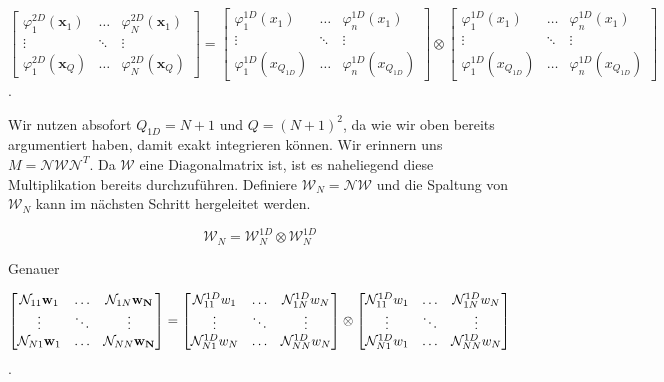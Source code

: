 \begin{equation*}
\begin{bmatrix}
\varphi^{2D}_1(\bm{x}_1) & \hdots & \varphi^{2D}_N(\bm{x}_1) \\
\vdots & \ddots & \vdots \\
\varphi^{2D}_1(\bm{x}_Q) & \hdots & \varphi^{2D}_N(\bm{x}_Q)
\end{bmatrix}
=
\begin{bmatrix}
\varphi^{1D}_1(x_1) & \hdots & \varphi^{1D}_n(x_1) \\
\vdots & \ddots & \vdots \\
\varphi^{1D}_1(x_{Q_{1D}}) & \hdots & \varphi^{1D}_n(x_{Q_{1D}})
\end{bmatrix}
\otimes
\begin{bmatrix}
\varphi^{1D}_1(x_1) & \hdots & \varphi^{1D}_n(x_1) \\
\vdots & \ddots & \vdots \\
\varphi^{1D}_1(x_{Q_{1D}}) & \hdots & \varphi^{1D}_n(x_{Q_{1D}})
\end{bmatrix}
\end{equation*}.

Wir nutzen absofort $Q_{1D}=N+1$ und $Q=(N+1)^2$, da wie wir oben bereits argumentiert haben, damit exakt integrieren können.
Wir erinnern uns $M=\mathcal{N} \mathcal{W} \mathcal{N}^T$. Da $\mathcal{W}$ eine Diagonalmatrix ist, ist es naheliegend diese Multiplikation bereits durchzuführen. Definiere $\mathcal{W}_{N}=\mathcal{N} \mathcal{W}$ und die Spaltung von $\mathcal{W}_N$ kann im nächsten Schritt hergeleitet werden.

\begin{equation} \label{eq:weight}
\mathcal{W}_N = \mathcal{W}_N^{1D} \otimes \mathcal{W}_N^{1D}
\end{equation}

Genauer

\begin{equation*}
\begin{bmatrix}
\mathcal{N}_{11} \bold{w}_1 & \hdots & \mathcal{N}_{1N} \bold{w_N} \\
\vdots & \ddots & \vdots \\
\mathcal{N}_{N1} \bold{w}_1 & \hdots & \mathcal{N}_{NN} \bold{w_N}
\end{bmatrix}
= 
\begin{bmatrix}
\mathcal{N}_{11}^{1D} w_1 & \hdots & \mathcal{N}_{1N}^{1D} w_N \\
\vdots & \ddots & \vdots \\
\mathcal{N}_{N1}^{1D} w_N & \hdots & \mathcal{N}_{NN}^{1D} w_N
\end{bmatrix}
\otimes
\begin{bmatrix}
\mathcal{N}_{11}^{1D} w_1 & \hdots & \mathcal{N}_{1N}^{1D} w_N \\
\vdots & \ddots & \vdots \\
\mathcal{N}_{N1}^{1D} w_1 & \hdots & \mathcal{N}_{NN}^{1D}w_N
\end{bmatrix}
\end{equation*}.

